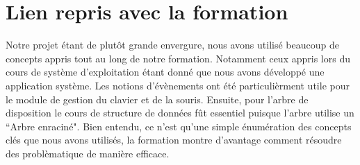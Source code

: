 \documentclass[titlepage]{article}
\begin{document}
\section{Lien repris avec la formation}
Notre projet étant de plutôt grande envergure, nous avons utilisé beaucoup de
concepts appris tout au long de notre formation. Notamment ceux appris lors du
cours de système d'exploitation étant donné que nous avons développé une
application système. Les notions d'évènements ont été particulièrment utile pour
le module de gestion du clavier et de la souris. Ensuite, pour l'arbre de
disposition le cours de structure de données fût essentiel puisque l'arbre
utilise un ``Arbre enraciné". Bien entendu, ce n'est qu'une simple énumération
des concepts clés que nous avons utilisés, la formation montre d'avantage
comment résoudre des problèmatique de manière efficace.
\end{document}
